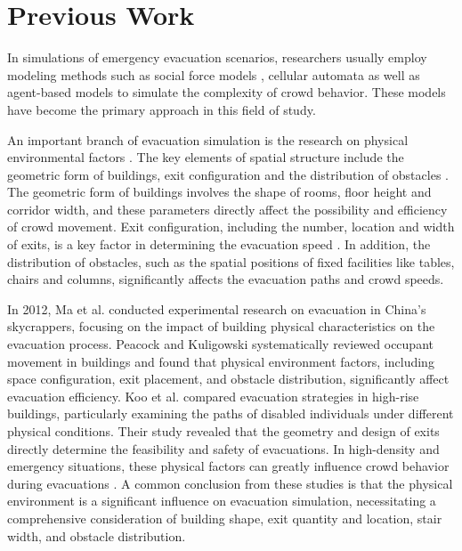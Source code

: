 \section{Previous Work}
In simulations of emergency evacuation scenarios, researchers usually employ modeling methods such as social force models \cite{helbingSocialForceModel1995}, cellular automata \cite{YUAN2007549} as well as agent-based models \cite{Bonabeau2002} to simulate the complexity of crowd behavior. These models have become the primary approach in this field of study.

An important branch of evacuation simulation is the research on physical environmental factors \cite{gwynneReviewMethodologiesUsed1999}. The key elements of spatial structure include the geometric form of buildings, exit configuration and the distribution of obstacles \cite{gwynneReviewMethodologiesUsed1999}. The geometric form of buildings involves the shape of rooms, floor height and corridor width, and these parameters directly affect the possibility and efficiency of crowd movement. Exit configuration, including the number, location and width of exits, is a key factor in determining the evacuation speed \cite{liuEvaluatingClassroomEvacuation}. In addition, the distribution of obstacles, such as the spatial positions of fixed facilities like tables, chairs and columns, significantly affects the evacuation paths and crowd speeds\cite{liuEvaluatingClassroomEvacuation,linSimulatingEffectsGate2023}.

In 2012, Ma et al.\cite{maExperimentalStudyUltra2012} conducted experimental research on evacuation in China's skycrappers, focusing on the impact of building physical characteristics on the evacuation process. Peacock and Kuligowski \cite{kuligowskiReviewBuildingEvacuation2010} systematically reviewed occupant movement in buildings and found that physical environment factors, including space configuration, exit placement, and obstacle distribution, significantly affect evacuation efficiency. Koo et al. \cite{kooComparativeStudyEvacuation2013} compared evacuation strategies in high-rise buildings, particularly examining the paths of disabled individuals under different physical conditions. Their study revealed that the geometry and design of exits directly determine the feasibility and safety of evacuations. In high-density and emergency situations, these physical factors can greatly influence crowd behavior during evacuations \cite{helbingSimulatingDynamicalFeatures2000}. A common conclusion from these studies is that the physical environment is a significant influence on evacuation simulation, necessitating a comprehensive consideration of building shape, exit quantity and location, stair width, and obstacle distribution.

